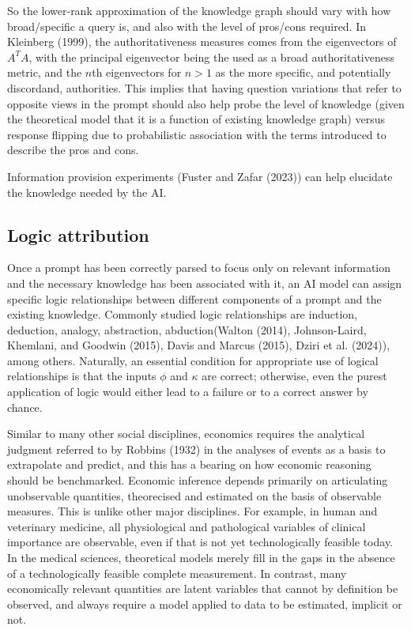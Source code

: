 \documentclass[
]{article}
\begin{document}
So the lower-rank approximation of the knowledge graph should vary with
how broad/specific a query is, and also with the level of pros/cons
required. In Kleinberg (1999), the authoritativeness measures comes from
the eigenvectors of \(A^TA\), with the principal eigenvector being the
used as a broad authoritativeness metric, and the \(n\)th eigenvectors
for \(n>1\) as the more specific, and potentially discordand,
authorities. This implies that having question variations that refer to
opposite views in the prompt should also help probe the level of
knowledge (given the theoretical model that it is a function of existing
knowledge graph) versus response flipping due to probabilistic
association with the terms introduced to describe the pros and cons.

Information provision experiments (Fuster and Zafar (2023)) can help
elucidate the knowledge needed by the AI.

\subsection{Logic attribution}\label{logic-attribution}

Once a prompt has been correctly parsed to focus only on relevant
information and the necessary knowledge has been associated with it, an
AI model can assign specific logic relationships between different
components of a prompt and the existing knowledge. Commonly studied
logic relationships are induction, deduction, analogy, abstraction,
abduction(Walton (2014), Johnson-Laird, Khemlani, and Goodwin (2015),
Davis and Marcus (2015), Dziri et al. (2024)), among others. Naturally,
an essential condition for appropriate use of logical relationships is
that the inputs \(\phi\) and \(\kappa\) are correct; otherwise, even the
purest application of logic would either lead to a failure or to a
correct answer by chance.

Similar to many other social disciplines, economics requires the
analytical judgment referred to by Robbins (1932) in the analyses of
events as a basis to extrapolate and predict, and this has a bearing on
how economic reasoning should be benchmarked. Economic inference depends
primarily on articulating unobservable quantities, theorecised and
estimated on the basis of observable measures. This is unlike other
major disciplines. For example, in human and veterinary medicine, all
physiological and pathological variables of clinical importance are
observable, even if that is not yet technologically feasible today. In
the medical sciences, theoretical models merely fill in the gaps in the
absence of a technologically feasible complete measurement. In contrast,
many economically relevant quantities are latent variables that cannot
by definition be observed, and always require a model applied to data to
be estimated, implicit or not.
\end{document}
